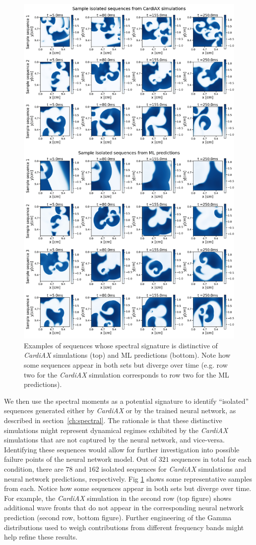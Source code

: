 \documentclass[utf8]{frontiers_suppmat} %
\begin{document}
\begin{figure}[tp]
\centering
\includegraphics[width=.8\textwidth]{figures/old_figures/Figure-6.jpg}
\caption{Examples of sequences whose spectral signature is distinctive of \textit{CardiAX} simulations (top) and ML predictions (bottom). Note how some sequences appear in both sets but diverge over time (e.g. row two for the \textit{CardiAX} simulation corresponds to row two for the ML predictions).}
\label{fig:isolatedsequences}
\end{figure}

We then use the spectral moments as a potential signature to identify ``isolated'' sequences generated either by \textit{CardiAX} or by the trained neural network, as described in section~\ref{ch:spectral}. The rationale is that these distinctive simulations might represent dynamical regimes exhibited by the \textit{CardiAX} simulations that are not captured by the neural network, and vice-versa. Identifying these sequences would allow for further investigation into possible failure points of the neural network model.
Out of $321$ sequences in total for each condition, there are $78$ and $162$ isolated sequences for \textit{CardiAX} simulations and neural network predictions, respectively. Fig \ref{fig:isolatedsequences} shows some representative samples from each. Notice how some sequences appear in both sets but diverge over time. For example, the \textit{CardiAX} simulation in the second row (top figure) shows additional wave fronts that do not appear in the corresponding neural network prediction (second row, bottom figure). Further engineering of the Gamma distributions used to weigh contributions from different frequency bands might help refine these results.
\end{document}
